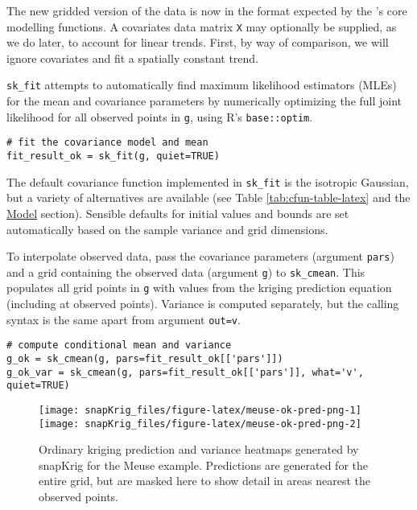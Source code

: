 The new gridded version of the data is now in the format expected by the 's core modelling functions. A covariates data matrix \texttt{X} may optionally be supplied, as we do later, to account for linear trends. First, by way of comparison, we will ignore covariates and fit a spatially constant trend.

\texttt{sk\_fit} attempts to automatically find maximum likelihood estimators (MLEs) for the mean and covariance parameters by numerically optimizing the full joint likelihood for all observed points in \texttt{g}, using R's \texttt{base::optim}.

\begin{verbatim}
# fit the covariance model and mean
fit_result_ok = sk_fit(g, quiet=TRUE)
\end{verbatim}

The default covariance function implemented in \texttt{sk\_fit} is the isotropic Gaussian, but a variety of alternatives are available
(see Table \ref{tab:cfun-table-latex} and the \protect\hyperlink{model}{Model} section). Sensible defaults for initial values and bounds are set automatically based on the sample variance and grid dimensions.

To interpolate observed data, pass the covariance parameters (argument \texttt{pars}) and a grid containing the observed data (argument \texttt{g}) to \texttt{sk\_cmean}. This populates all grid points in \texttt{g} with values from the kriging prediction equation (including at observed points). Variance is computed separately, but the calling syntax is the same apart from argument \texttt{out=\textquotesingle{}v\textquotesingle{}}.

\begin{verbatim}
# compute conditional mean and variance 
g_ok = sk_cmean(g, pars=fit_result_ok[['pars']])
g_ok_var = sk_cmean(g, pars=fit_result_ok[['pars']], what='v', quiet=TRUE)
\end{verbatim}

\begin{figure}
\texttt{[image: snapKrig\_files/figure-latex/meuse-ok-pred-png-1]} \texttt{[image: snapKrig\_files/figure-latex/meuse-ok-pred-png-2]} \caption{Ordinary kriging prediction and variance heatmaps generated by snapKrig for the Meuse example. Predictions are generated for the entire grid, but are masked here to show detail in areas nearest the observed points.}\label{fig:meuse-ok-pred-png}
\end{figure}

